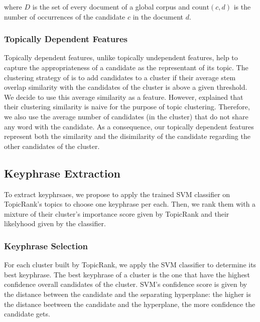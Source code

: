       where $D$ is the set of every document of a global corpus and
      $\text{count}(c, d)$ is the number of occurrences of the candidate $c$ in
      the document $d$.

    \subsubsection{Topically Dependent Features}
    \label{subsubsec:topically_dependent_features}
      Topically dependent features, unlike topically undependent features, help
      to capture the appropriateness of a candidate as the representant of its
      topic. The clustering strategy of  is to
      add candidates to a cluster if their average stem overlap similarity with
      the candidates of the cluster is above a given threshold. We decide to
      use this average similarity as a feature. However,
       explained that their clustering similarity
      is naive for the purpose of topic clustering. Therefore, we also use the
      average number of candidates (in the cluster) that do not share any word
      with the candidate. As a consequence, our topically dependent features
      represent both the similarity and the disimilarity of the candidate
      regarding the other candidates of the cluster.

  \subsection{Keyphrase Extraction}
  \label{subsec:keyphrase_extraction}
    To extract keyphrsaes, we propose to apply the trained SVM classifier on
    TopicRank's topics to choose one keyphrase per each. Then, we rank them
    with a mixture of their cluster's importance score given by TopicRank and
    their likelyhood given by the classifier.

    \subsubsection{Keyphrase Selection}
    \label{subsubsec:keyphrase_selection}
      For each cluster built by TopicRank, we apply the SVM classifier to
      determine its best keyphrase. The best keyphrase of a cluster is the one
      that have the highest confidence overall candidates of the cluster. SVM's
      confidence score is given by the distance between the candidate and the
      separating hyperplane: the higher is the distance beetween the candidate
      and the hyperplane, the more confidence the candidate gets.

